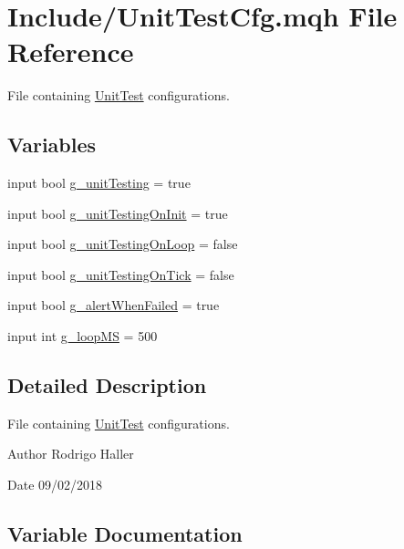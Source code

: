 \hypertarget{_unit_test_cfg_8mqh}{}\section{Include/\+Unit\+Test\+Cfg.mqh File Reference}
\label{_unit_test_cfg_8mqh}


File containing \mbox{\hyperlink{class_unit_test}{Unit\+Test}} configurations.  


\subsection*{Variables}
\begin{DoxyCompactItemize}
\item 
input bool \mbox{\hyperlink{_unit_test_cfg_8mqh_a31abf9be05dbe668d70e868ad61aa0c6}{g\+\_\+unit\+Testing}} = true
\item 
input bool \mbox{\hyperlink{_unit_test_cfg_8mqh_ab232ce44ed0eb777193148652dd3f4ad}{g\+\_\+unit\+Testing\+On\+Init}} = true
\item 
input bool \mbox{\hyperlink{_unit_test_cfg_8mqh_a55b896e4657e5db89a5607a8465ffdca}{g\+\_\+unit\+Testing\+On\+Loop}} = false
\item 
input bool \mbox{\hyperlink{_unit_test_cfg_8mqh_a856d49e2751c35968dcc24bac5a190c1}{g\+\_\+unit\+Testing\+On\+Tick}} = false
\item 
input bool \mbox{\hyperlink{_unit_test_cfg_8mqh_afd4fbce07023b027115562cbfb557fbe}{g\+\_\+alert\+When\+Failed}} = true
\item 
input int \mbox{\hyperlink{_unit_test_cfg_8mqh_a2092542860cef1f04c0efd7a04ceac78}{g\+\_\+loop\+MS}} = 500
\end{DoxyCompactItemize}


\subsection{Detailed Description}
File containing \mbox{\hyperlink{class_unit_test}{Unit\+Test}} configurations. 

\begin{DoxyAuthor}{Author}
Rodrigo Haller 
\end{DoxyAuthor}
\begin{DoxyDate}{Date}
09/02/2018 
\end{DoxyDate}


\subsection{Variable Documentation}
\mbox{\label{_unit_test_cfg_8mqh_afd4fbce07023b027115562cbfb557fbe}} 
